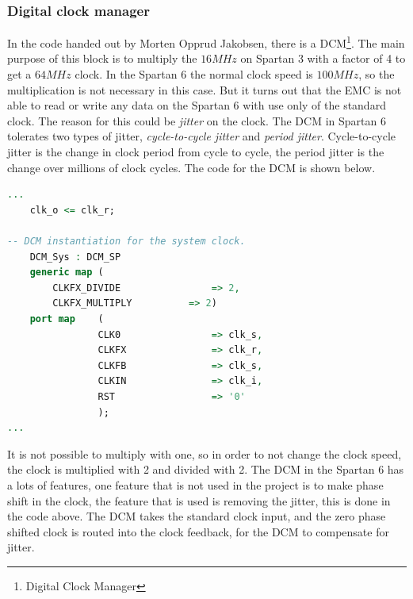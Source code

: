 \subsubsection{Digital clock manager}
In the code handed out by Morten Opprud Jakobsen, there is a DCM\footnote{Digital Clock Manager}. The main purpose of this block is to multiply the $16MHz$ on Spartan 3 with a factor of 4 to get a $64MHz$ clock. In the Spartan 6 the normal clock speed is $100MHz$, so the multiplication is not necessary in this case. But it turns out that the EMC is not able to read or write any data on the Spartan 6 with use only of the standard clock. The reason for this could be \textit{jitter} on the clock. The DCM in Spartan 6 tolerates two types of jitter, \textit{cycle-to-cycle jitter} and \textit{period jitter}. Cycle-to-cycle jitter is the change in clock period from cycle to cycle, the period jitter is the change over millions of clock cycles. The code for the DCM is shown below.
\begin{lstlisting}[language=VHDL, caption=DCM\_SP]
...
	clk_o <= clk_r;

-- DCM instantiation for the system clock.
	DCM_Sys : DCM_SP
	generic map (
		CLKFX_DIVIDE				=> 2,											-- Can be any integer from 1 to 32
		CLKFX_MULTIPLY			=> 2)											-- Can be any integer from 2 to 32
	port map	(
				CLK0				=> clk_s,											-- 0 degree DCM CLK ouptput
				CLKFX				=> clk_r,											-- DCM CLK synthesis out (M/D)
				CLKFB				=> clk_s,											-- DCM clock feedback
				CLKIN				=> clk_i,											-- Clock input (from IBUFG, BUFG or DCM)
				RST					=> '0'												-- DCM asynchronous reset input
				);
...
\end{lstlisting}
It is not possible to multiply with one, so in order to not change the clock speed, the clock is multiplied with 2 and divided with 2. The DCM in the Spartan 6 has a lots of features, one feature that is not used in the project is to make phase shift in the clock, the feature that is used is removing the jitter, this is done in the code above. The DCM takes the standard clock input, and the zero phase shifted clock is routed into the clock feedback, for the DCM to compensate for jitter.

